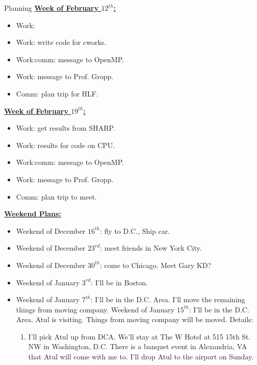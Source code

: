 \documentclass[serif, mathserif, final]{beamer}
\begin{document}
\begin{frame}
\begin{columns}
\begin{column}{0.5\textwidth}
\begin{block}{Planning}
\underline{{\bf Week of February $12^{th}$:}}
\begin{itemize}
\small \item \small Work: 
\item \small Work: write code for cworks.
\item \small Work:comm: message to OpenMP.
\item \small Work: message to Prof. Gropp. 
\item \small Comm: plan trip for HLF. 
\end{itemize}

\underline{{\bf Week of February $19^{th}$:}}
\begin{itemize}
\small \item \small Work: get results from SHARP. 
\item \small Work: results for code on CPU.
\item \small Work:comm: message to OpenMP. 
\item \small Work: message to Prof. Gropp. 
\item \small Comm: plan trip to meet. 
\end{itemize}

{\underline{\bf Weekend Plans:}} 
\begin{itemize}
\tiny \item \tiny Weekend of December $16^{th}$: fly to D.C., Ship car.
\item \tiny Weekend of December $23^{rd}$: meet friends in New York City.
\item \tiny Weekend of December $30^{th}$: come to Chicago. Meet Gary KD?
\item \tiny Weekend of January $3^{rd}$: I'll be in Boston.
\item \tiny Weekend of January $7^{th}$: I'll be in the D.C. Area. I'll move the remaining things from moving company.
\tiny \tiny Weekend of January $15^{th}$: I'll be in the
D.C. Area. Atul is visiting. Things from moving company will be
moved. Details: 
\begin{enumerate}
\tiny \item \tiny I'll pick Atul up from DCA. We'll stay at The W
Hotel at 515 15th St. NW in Washington, D.C. There is a banquet event
in Alexandria, VA that Atul will come with me to. I'll drop Atul to the airport on Sunday. 
\end{enumerate}


\end{itemize}
\end{block}
\end{column}
\end{columns}
\end{frame}
\end{document}
